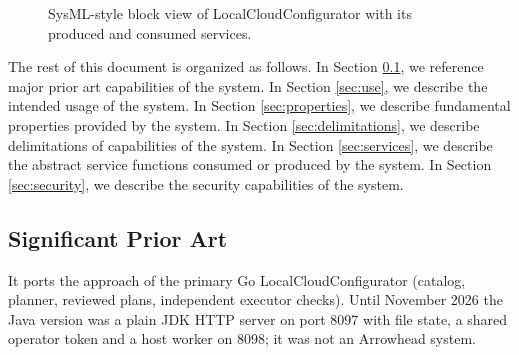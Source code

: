 \documentclass[a4paper]{arrowhead}
\begin{document}
\begin{figure}[ht!]
  \centering
  \caption{SysML-style block view of LocalCloudConfigurator with its produced and consumed services.}
  \label{fig:system}
\end{figure}

The rest of this document is organized as follows.
In Section \ref{sec:prior_art}, we reference major prior art capabilities of the system.
In Section \ref{sec:use}, we describe the intended usage of the system.
In Section \ref{sec:properties}, we describe fundamental properties provided by the system.
In Section \ref{sec:delimitations}, we describe delimitations of capabilities of the system.
In Section \ref{sec:services}, we describe the abstract service functions consumed or produced by the system.
In Section \ref{sec:security}, we describe the security capabilities of the system.

\newpage

\subsection{Significant Prior Art}
\label{sec:prior_art}

It ports the approach of the primary Go LocalCloudConfigurator (catalog, planner, reviewed plans, independent executor checks). Until November 2026 the Java version was a plain JDK HTTP server on port 8097 with file state, a shared operator token and a host worker on 8098; it was not an Arrowhead system.
\end{document}
